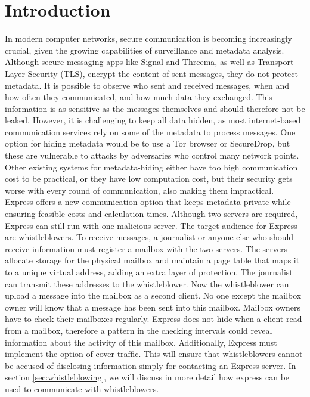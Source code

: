 \documentclass[a4paper]{article}
\begin{document}
\section{Introduction}
\label{sec:intro}
In modern computer networks, secure communication is becoming increasingly crucial, given the growing capabilities of surveillance and metadata analysis. Although secure messaging apps like Signal and Threema, as well as Transport Layer Security (TLS), encrypt the content of sent messages, they do not protect metadata. It is possible to observe who sent and received messages, when and how often they communicated, and how much data they exchanged. This information is as sensitive as the messages themselves and should therefore not be leaked. However, it is challenging to keep all data hidden, as most internet-based communication services rely on some of the metadata to process messages. One option for hiding metadata would be to use a Tor browser or SecureDrop, but these are vulnerable to attacks by adversaries who control many network points.  Other existing systems for metadata-hiding either have too high communication cost to be practical, or they have low computation cost, but their security gets worse with every round of communication, also making them impractical.\\
Express \citep{Eskandarian2021} offers a new communication option that keeps metadata private while ensuring feasible costs and calculation times. Although two servers are required, Express can still run with one malicious server. 
The target audience for Express are whistleblowers. To receive messages, a journalist or anyone else who should receive information must register a mailbox with the two servers. The servers allocate storage for the physical mailbox and maintain a page table that maps it to a unique virtual address, adding an extra layer of protection. The journalist can transmit these addresses to the whistleblower. Now the whistleblower can upload a message into the mailbox as a second client. No one except the mailbox owner will know that a message has been sent into this mailbox. Mailbox owners have to check their mailboxes regularly. Express does not hide when a client read from a mailbox, therefore a pattern in the checking intervals could reveal information about the activity of this mailbox. Additionally, Express must implement the option of cover traffic.  This will ensure that whistleblowers cannot be accused of disclosing information simply for contacting an Express server. In section \ref{sec:whistleblowing}, we will discuss in more detail how express can be used to communicate with whistleblowers.\\
\end{document}
